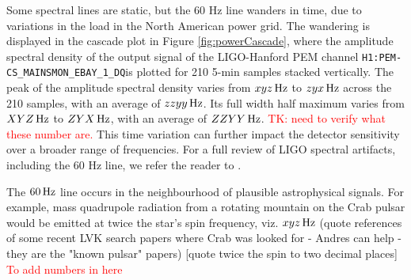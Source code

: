 \documentclass[pra,superscriptaddress,reprint,amsmath,amssymb,nofootinbib]{revtex4-2}
\newcommand{\CSOneName}{\texttt{H1:PEM-CS\_MAINSMON\_EBAY\_1\_DQ}}
\begin{document}
Some spectral lines are static, but the 60 Hz line wanders in time, due to variations in the load in the North American power grid. The wandering is displayed in the cascade plot in Figure \ref{fig:powerCascade}, where the amplitude spectral density of the output signal of the LIGO-Hanford PEM channel \CSOneName is plotted for 210 5-min samples stacked vertically. The peak of the amplitude spectral density varies from $xyz \, {\rm Hz}$ to $zyx \, {\rm Hz}$ across the 210 samples, with an average of $zzyy \, {\rm Hz}$. Its full width half maximum varies from $XYZ \, {\rm Hz}$ to $ZYX \, {\rm Hz}$, with an average of $ZZYY \, {\rm Hz}$. \textcolor{red}{TK: need to verify what these number are.} 	This time variation can further impact the detector sensitivity over a broader range of frequencies. For a full review of LIGO spectral artifacts, including the 60 Hz line, we refer the reader to \cite{CovasEtAl:2018}. \newline 


The $60 \, {\rm Hz}$ line occurs in the neighbourhood of plausible astrophysical signals. For example, mass quadrupole radiation from a rotating mountain on the Crab pulsar would be emitted at twice the star's spin frequency, viz. $xyz \, {\rm Hz}$ (quote references of some recent LVK search papers where Crab was looked for - Andres can help - they are the "known pulsar" papers) [quote twice the spin to two decimal places] \textcolor{red}{To add numbers in here}
\end{document}
